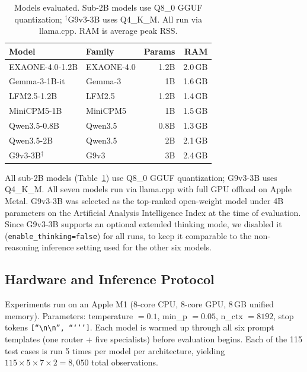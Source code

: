 \documentclass[11pt,twocolumn]{article}
\begin{document}
\begin{table}[t]
\centering
\footnotesize
\setlength{\tabcolsep}{4pt}
\begin{tabular}{@{}p{2.8cm}p{2.0cm}rr@{}}
\toprule
\textbf{Model} & \textbf{Family} & \textbf{Params} & \textbf{RAM} \\
\midrule
EXAONE-4.0-1.2B & EXAONE-4.0 \citeyearpar{lgai2025exaone} & 1.2B & 2.0\,GB \\
Gemma-3-1B-it   & Gemma-3 \citeyearpar{team2025gemma}     & 1B   & 1.6\,GB \\
LFM2.5-1.2B     & LFM2.5 \citeyearpar{liquidai2026lfm25}  & 1.2B & 1.4\,GB \\
MiniCPM5-1B     & MiniCPM5 \citeyearpar{openbmb2026minicpm5}       & 1B   & 1.5\,GB \\
Qwen3.5-0.8B    & Qwen3.5 \citeyearpar{qwen2026qwen35}    & 0.8B & 1.3\,GB \\
Qwen3.5-2B      & Qwen3.5 \citeyearpar{qwen2026qwen35}    & 2B   & 2.1\,GB \\
\midrule
G9v3-3B$^\dagger$ & G9v3 \citeyearpar{ai9stars2026g9v33b}  & 3B   & 2.4\,GB \\
\bottomrule
\end{tabular}
\caption{Models evaluated. Sub-2B models use Q8\_0 GGUF
quantization; $^\dagger$G9v3-3B uses Q4\_K\_M. All run via
llama.cpp. RAM is average peak RSS.}
\label{tab:models}
\end{table}

All sub-2B models (Table~\ref{tab:models}) use Q8\_0 GGUF
quantization; G9v3-3B uses Q4\_K\_M. All seven models run via
llama.cpp \citep{llamacpp2023} with full GPU offload on Apple Metal.
G9v3-3B was selected as the top-ranked open-weight model under 4B
parameters on the Artificial Analysis Intelligence Index at the
time of evaluation. Since G9v3-3B supports an optional extended
thinking mode, we disabled it (\texttt{enable\_thinking=false}) for
all runs, to keep it comparable to the non-reasoning inference
setting used for the other six models.

\subsection{Hardware and Inference Protocol}

Experiments run on an Apple M1 (8-core CPU, 8-core GPU, 8\,GB unified
memory).
Parameters: temperature $= 0.1$, min\_p $= 0.05$, n\_ctx $= 8192$,
stop tokens \texttt{[``\textbackslash n\textbackslash n'', ```'']}.
Each model is warmed up through all six prompt templates (one router +
five specialists) before evaluation begins.
Each of the 115 test cases is run 5 times per model per architecture,
yielding $115\!\times\!5\!\times\!7\!\times\!2 = 8{,}050$ total
observations.
\end{document}
